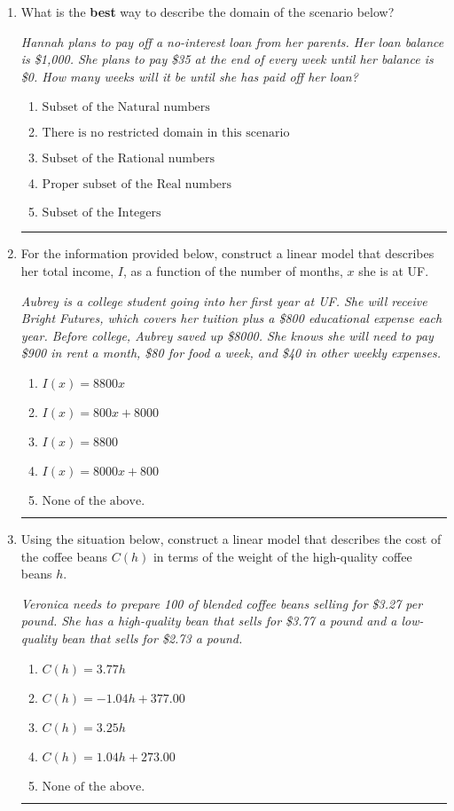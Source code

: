 \documentclass[14pt]{extbook}
\newcommand{\litem}[1]{\item#1\hspace*{-1cm}\rule{\textwidth}{0.4pt}}
\begin{document}
\begin{enumerate}
{\begin{enumerate}[label=\Alph*.]
\end{enumerate} }
\litem{
What is the \textbf{best} way to describe the domain of the scenario below?
\begin{center}
    \textit{ Hannah plans to pay off a no-interest loan from her parents. Her loan balance is \$1,000. She plans to pay \$35 at the end of every week until her balance is \$0. How many weeks will it be until she has paid off her loan? }
\end{center}
\begin{enumerate}[label=\Alph*.]
\item \( \text{Subset of the Natural numbers} \)
\item \( \text{There is no restricted domain in this scenario} \)
\item \( \text{Subset of the Rational numbers} \)
\item \( \text{Proper subset of the Real numbers} \)
\item \( \text{Subset of the Integers} \)

\end{enumerate} }
\litem{
For the information provided below, construct a linear model that describes her total income, $I$, as a function of the number of months, $x$ she is at UF.
\begin{center}
    \textit{ Aubrey is a college student going into her first year at UF. She will receive Bright Futures, which covers her tuition plus a \$800 educational expense each year. Before college, Aubrey saved up \$8000. She knows she will need to pay \$900 in rent a month, \$80 for food a week, and \$40 in other weekly expenses. }
\end{center}
\begin{enumerate}[label=\Alph*.]
\item \( I(x) = 8800 x \)
\item \( I(x) = 800 x + 8000 \)
\item \( I(x) = 8800 \)
\item \( I(x) = 8000 x + 800 \)
\item \( \text{None of the above.} \)

\end{enumerate} }
\litem{
Using the situation below, construct a linear model that describes the cost of the coffee beans $C(h)$ in terms of the weight of the high-quality coffee beans $h$.
\begin{center}
    \textit{ Veronica needs to prepare 100 of blended coffee beans selling for \$3.27 per pound. She has a high-quality bean that sells for \$3.77 a pound and a low-quality bean that sells for \$2.73 a pound. }
\end{center}
\begin{enumerate}[label=\Alph*.]
\item \( C(h) = 3.77 h \)
\item \( C(h) = -1.04 h + 377.00 \)
\item \( C(h) = 3.25 h \)
\item \( C(h) = 1.04 h + 273.00 \)
\item \( \text{None of the above.} \)


\end{enumerate}}
\end{enumerate}
\end{document}
